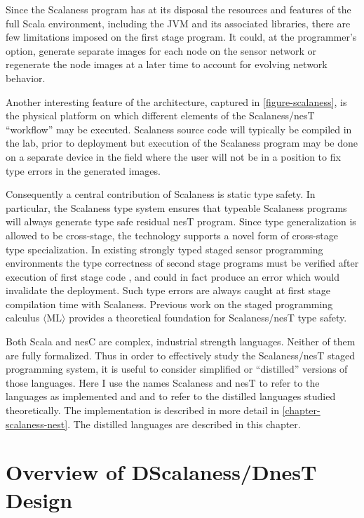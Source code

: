 Since the Scalaness program has at its disposal the resources and features of the full Scala
environment, including the JVM and its associated libraries, there are few limitations imposed
on the first stage program. It could, at the programmer's option, generate separate images for
each node on the sensor network or regenerate the node images at a later time to account for
evolving network behavior.

Another interesting feature of the architecture, captured in \autoref{figure-scalaness}, is the
physical platform on which different elements of the Scalaness/nesT ``workflow'' may be
executed. Scalaness source code will typically be compiled in the lab, prior to deployment but
execution of the Scalaness program may be done on a separate device in the field where the user
will not be in a position to fix type errors in the generated images.

Consequently a central contribution of Scalaness is static type safety. In particular, the
Scalaness type system ensures that typeable Scalaness programs will always generate type safe
residual nesT program. Since type generalization is allowed to be cross-stage, the technology
supports a novel form of cross-stage type specialization. In existing strongly typed staged
sensor programming environments the type correctness of second stage programs must be verified
after execution of first stage code \cite{Mainland-Flask-2008}, and could in fact produce an
error which would invalidate the deployment. Such type errors are always caught at first stage
compilation time with Scalaness. Previous work on the staged programming calculus $\langle
\text{ML} \rangle$ \cite{FramedML} provides a theoretical foundation for Scalaness/nesT type
safety.

Both Scala and nesC are complex, industrial strength languages. Neither of them are fully
formalized. Thus in order to effectively study the Scalaness/nesT staged programming system, it
is useful to consider simplified or ``distilled'' versions of those languages. Here I use the
names Scalaness and nesT to refer to the languages as implemented and  and
 to refer to the distilled languages studied theoretically. The implementation is
described in more detail in \autoref{chapter-scalaness-nest}. The distilled languages are
described in this chapter.

\section{Overview of DScalaness/DnesT Design}


